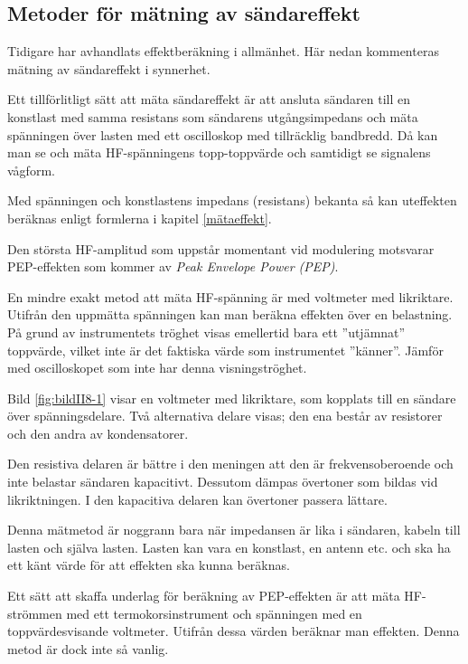 \subsection{Metoder för mätning av sändareffekt}

Tidigare har avhandlats effektberäkning i allmänhet.
Här nedan kommenteras mätning av sändareffekt i synnerhet.

Ett tillförlitligt sätt att mäta sändareffekt är att ansluta sändaren
till en konstlast med samma resistans som sändarens utgångsimpedans
och mäta spänningen över lasten med ett oscilloskop med tillräcklig bandbredd.
Då kan man se och mäta HF-spänningens topp-toppvärde och samtidigt se
signalens vågform.

Med spänningen och konstlastens impedans (resistans) bekanta så kan
uteffekten beräknas enligt formlerna i kapitel \ref{mätaeffekt}.

Den största HF-amplitud som uppstår momentant vid modulering motsvarar
PEP-effekten som kommer av \emph{Peak Envelope Power (PEP)}.

En mindre exakt metod att mäta HF-spänning är med voltmeter med likriktare.
Utifrån den uppmätta spänningen kan man beräkna effekten över en belastning.
På grund av instrumentets tröghet visas emellertid bara ett ''utjämnat''
toppvärde, vilket inte är det faktiska värde som instrumentet ''känner''.
Jämför med oscilloskopet som inte har denna visningströghet.


Bild \ref{fig:bildII8-1} visar en voltmeter med likriktare, som kopplats till
en sändare över spänningsdelare.
Två alternativa delare visas; den ena består av resistorer och den andra av
kondensatorer.

Den resistiva delaren är bättre i den meningen att den är frekvensoberoende och
inte belastar sändaren kapacitivt.
Dessutom dämpas övertoner som bildas vid likriktningen.
I den kapacitiva delaren kan övertoner passera lättare.

Denna mätmetod är noggrann bara när impedansen är lika i sändaren,
kabeln till lasten och själva lasten.
Lasten kan vara en konstlast, en antenn etc. och ska ha ett känt värde för att
effekten ska kunna beräknas.

Ett sätt att skaffa underlag för beräkning av PEP-effekten är att mäta
HF-strömmen med ett termokorsinstrument och spänningen med en
toppvärdesvisande voltmeter.
Utifrån dessa värden beräknar man effekten.
Denna metod är dock inte så vanlig.

